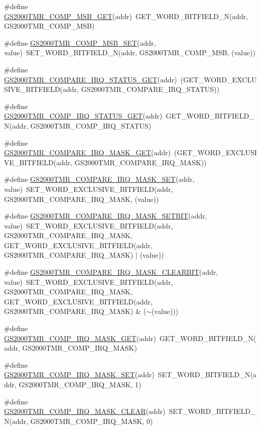 \begin{DoxyCompactItemize}
\item 
\#define \hyperlink{a00555_ad64a6d18fab173740cb81375752fee16}{GS2000TMR\_\-COMP\_\-MSB\_\-GET}(addr)~GET\_\-WORD\_\-BITFIELD\_\-N(addr, GS2000TMR\_\-COMP\_\-MSB)
\item 
\#define \hyperlink{a00555_aec5315119d651ca4ac8af92a65decadf}{GS2000TMR\_\-COMP\_\-MSB\_\-SET}(addr, value)~SET\_\-WORD\_\-BITFIELD\_\-N(addr, GS2000TMR\_\-COMP\_\-MSB, (value))
\item 
\#define \hyperlink{a00555_a6f7eeb97d23c592a23ee9d8615dc3997}{GS2000TMR\_\-COMPARE\_\-IRQ\_\-STATUS\_\-GET}(addr)~(GET\_\-WORD\_\-EXCLUSIVE\_\-BITFIELD(addr, GS2000TMR\_\-COMPARE\_\-IRQ\_\-STATUS))
\item 
\#define \hyperlink{a00555_a3143ac752854ee0f6c9bc91c5d0ff5a8}{GS2000TMR\_\-COMP\_\-IRQ\_\-STATUS\_\-GET}(addr)~GET\_\-WORD\_\-BITFIELD\_\-N(addr, GS2000TMR\_\-COMP\_\-IRQ\_\-STATUS)
\item 
\#define \hyperlink{a00555_a2c94f9f2d799bd49eadbe2a87ec464ac}{GS2000TMR\_\-COMPARE\_\-IRQ\_\-MASK\_\-GET}(addr)~(GET\_\-WORD\_\-EXCLUSIVE\_\-BITFIELD(addr, GS2000TMR\_\-COMPARE\_\-IRQ\_\-MASK))
\item 
\#define \hyperlink{a00555_a1688769f11c4264d42e78f55872b93b6}{GS2000TMR\_\-COMPARE\_\-IRQ\_\-MASK\_\-SET}(addr, value)~SET\_\-WORD\_\-EXCLUSIVE\_\-BITFIELD(addr, GS2000TMR\_\-COMPARE\_\-IRQ\_\-MASK, (value))
\item 
\#define \hyperlink{a00555_a7ee122359598ac37d7f468389196f7b2}{GS2000TMR\_\-COMPARE\_\-IRQ\_\-MASK\_\-SETBIT}(addr, value)~SET\_\-WORD\_\-EXCLUSIVE\_\-BITFIELD(addr, GS2000TMR\_\-COMPARE\_\-IRQ\_\-MASK, GET\_\-WORD\_\-EXCLUSIVE\_\-BITFIELD(addr, GS2000TMR\_\-COMPARE\_\-IRQ\_\-MASK) $|$ (value))
\item 
\#define \hyperlink{a00555_aeb6c750f9ed6c3f8bf0a3fa1f841f28f}{GS2000TMR\_\-COMPARE\_\-IRQ\_\-MASK\_\-CLEARBIT}(addr, value)~SET\_\-WORD\_\-EXCLUSIVE\_\-BITFIELD(addr, GS2000TMR\_\-COMPARE\_\-IRQ\_\-MASK, GET\_\-WORD\_\-EXCLUSIVE\_\-BITFIELD(addr, GS2000TMR\_\-COMPARE\_\-IRQ\_\-MASK) \& ($\sim$(value)))
\item 
\#define \hyperlink{a00555_a828f0e72457fae4c0def4bcc98d739c3}{GS2000TMR\_\-COMP\_\-IRQ\_\-MASK\_\-GET}(addr)~GET\_\-WORD\_\-BITFIELD\_\-N(addr, GS2000TMR\_\-COMP\_\-IRQ\_\-MASK)
\item 
\#define \hyperlink{a00555_a0a4d701cfe19980c971f93b4156d77b6}{GS2000TMR\_\-COMP\_\-IRQ\_\-MASK\_\-SET}(addr)~SET\_\-WORD\_\-BITFIELD\_\-N(addr, GS2000TMR\_\-COMP\_\-IRQ\_\-MASK, 1)
\item 
\#define \hyperlink{a00555_a4b6a10d7d61294a1123a82b630967375}{GS2000TMR\_\-COMP\_\-IRQ\_\-MASK\_\-CLEAR}(addr)~SET\_\-WORD\_\-BITFIELD\_\-N(addr, GS2000TMR\_\-COMP\_\-IRQ\_\-MASK, 0)

\end{DoxyCompactItemize}
